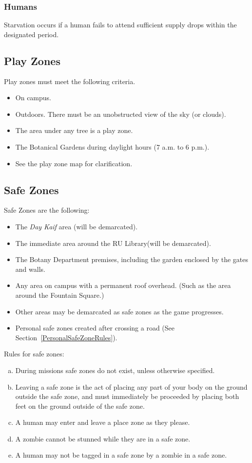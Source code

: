 \documentclass[a4paper,12pt]{article}
\begin{document}
    \subsubsection{Humans}
    Starvation occurs if a human fails to attend sufficient supply drops within the designated period.

\subsection{Play Zones}
Play zones must meet the following criteria.
\begin{itemize}
    \item On campus.
    \item Outdoors. There must be an unobstructed view of the sky (or clouds).
    \item The area under any tree is a play zone. 
    \item The Botanical Gardens during daylight hours (7 a.m. to 6 p.m.).
    \item See the play zone map for clarification.
\end{itemize}

\subsection{Safe Zones}
Safe Zones are the following:
\begin{itemize}
    \item The \emph{Day Kaif} area (will be demarcated).
    \item The immediate area around the RU Library(will be demarcated).
    \item The Botany Department premises, including the garden enclosed by the gates and walls.
    \item Any area on campus with a permanent roof overhead. (Such as the area around the Fountain Square.)
    \item Other areas may be demarcated as safe zones as the game progresses.
    \item Personal safe zones created after crossing a road (See Section~\ref{PersonalSafeZoneRules}).
\end{itemize}

Rules for safe zones:
\begin{enumerate}[(a)]
    \item During missions safe zones do not exist, unless otherwise specified.
    \item Leaving a safe zone is the act of placing any part of your body on the ground outside the safe zone, and must immediately be proceeded by placing both feet on the ground outside of the safe zone.
    \item A human may enter and leave a place zone as they please.
    \item A zombie cannot be stunned while they are in a safe zone.
    \item A human may not be tagged in a safe zone by a zombie in a safe zone.
\end{enumerate}
\end{document}
